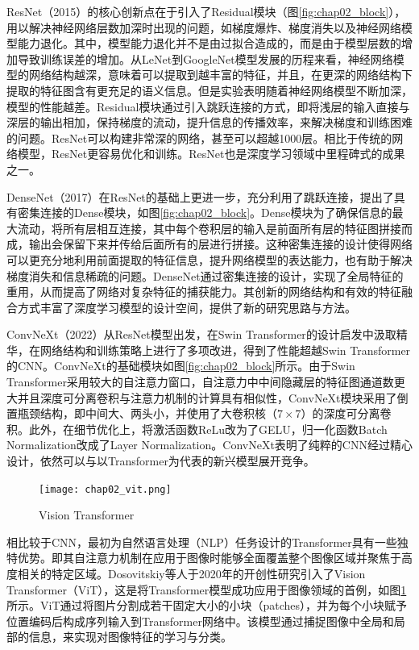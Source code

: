 ResNet\cite{he2016deep}（2015）的核心创新点在于引入了Residual模块（图\ref{fig:chap02_block}），用以解决神经网络层数加深时出现的问题，如梯度爆炸、梯度消失以及神经网络模型能力退化。其中，模型能力退化并不是由过拟合造成的，而是由于模型层数的增加导致训练误差的增加。从LeNet到GoogleNet模型发展的历程来看，神经网络模型的网络结构越深，意味着可以提取到越丰富的特征，并且，在更深的网络结构下提取的特征图含有更充足的语义信息。但是实验表明随着神经网络模型不断加深，模型的性能越差。Residual模块通过引入跳跃连接的方式，即将浅层的输入直接与深层的输出相加，保持梯度的流动，提升信息的传播效率，来解决梯度和训练困难的问题。ResNet可以构建非常深的网络，甚至可以超越1000层。相比于传统的网络模型，ResNet更容易优化和训练。ResNet也是深度学习领域中里程碑式的成果之一。

DenseNet\cite{huang2017densely}（2017）在ResNet的基础上更进一步，充分利用了跳跃连接，提出了具有密集连接的Dense模块，如图\ref{fig:chap02_block}。Dense模块为了确保信息的最大流动，将所有层相互连接，其中每个卷积层的输入是前面所有层的特征图拼接而成，输出会保留下来并传给后面所有的层进行拼接。这种密集连接的设计使得网络可以更充分地利用前面提取的特征信息，提升网络模型的表达能力，也有助于解决梯度消失和信息稀疏的问题。DenseNet通过密集连接的设计，实现了全局特征的重用，从而提高了网络对复杂特征的捕获能力。其创新的网络结构和有效的特征融合方式丰富了深度学习模型的设计空间，提供了新的研究思路与方法。

ConvNeXt\cite{liu2022convnet}（2022）从ResNet模型出发，在Swin Transformer\cite{liu2021swin}的设计启发中汲取精华，在网络结构和训练策略上进行了多项改进，得到了性能超越Swin Transformer的CNN。ConvNeXt的基础模块如图\ref{fig:chap02_block}所示。由于Swin Transformer采用较大的自注意力窗口，自注意力中中间隐藏层的特征图通道数更大并且深度可分离卷积与注意力机制的计算具有相似性，ConvNeXt模块采用了倒置瓶颈结构，即中间大、两头小，并使用了大卷积核（\(7\times7\)）的深度可分离卷积。此外，在细节优化上，将激活函数ReLu改为了GELU，归一化函数Batch Normalization\cite{ioffe2015batch}改成了Layer Normalization。ConvNeXt表明了纯粹的CNN经过精心设计，依然可以与以Transformer为代表的新兴模型展开竞争。

\begin{figure}[htbp]
    \centering
    \texttt{[image: chap02\_vit.png]}
    \caption{Vision Transformer}
    \label{fig:chap02_vit}
\end{figure}

相比较于CNN，最初为自然语言处理（NLP）任务设计的Transformer具有一些独特优势。即其自注意力机制在应用于图像时能够全面覆盖整个图像区域并聚焦于高度相关的特定区域。Dosovitskiy等人\cite{dosovitskiy2020image}于2020年的开创性研究引入了Vision Transformer（ViT），这是将Transformer模型成功应用于图像领域的首例，如图\ref{fig:chap02_vit}所示。ViT通过将图片分割成若干固定大小的小块（patches），并为每个小块赋予位置编码后构成序列输入到Transformer网络中。该模型通过捕捉图像中全局和局部的信息，来实现对图像特征的学习与分类。

